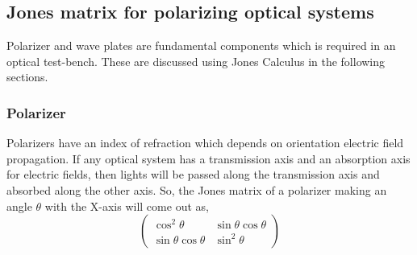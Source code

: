 \documentclass[../report.tex]{subfiles}
\begin{document}
\subsection{Jones matrix for polarizing optical systems}
Polarizer and wave plates are fundamental components which is required in an optical test-bench. These are discussed using Jones Calculus in the following sections.
\subsubsection{Polarizer}
Polarizers have an index of refraction which depends on orientation electric field propagation. If any optical system has a transmission axis and an absorption axis for electric fields, then lights will be passed along the transmission axis and absorbed along the other axis. So, the Jones matrix of a polarizer making an angle $\theta$ with the X-axis will come out as,
\begin{equation}\label{eq:jones_matrix_polarizer}
\left(\begin{matrix} 
\cos ^{2}\theta & \sin \theta \cos \theta \\ 
\sin \theta \cos \theta & \sin ^{2}\theta
\end{matrix} \right) 
\end{equation} 
\end{document}
